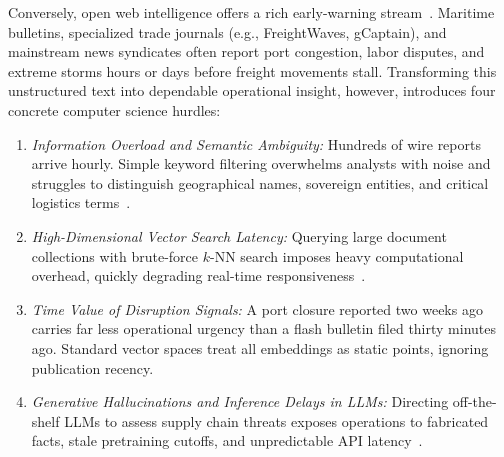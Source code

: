 \documentclass[conference]{IEEEtran}
\begin{document}
Conversely, open web intelligence offers a rich early-warning stream~\cite{jacob2025ai}. Maritime bulletins, specialized trade journals (e.g., FreightWaves, gCaptain), and mainstream news syndicates often report port congestion, labor disputes, and extreme storms hours or days before freight movements stall. Transforming this unstructured text into dependable operational insight, however, introduces four concrete computer science hurdles:
\begin{enumerate}[label=(\arabic*)]
    \item \textit{Information Overload and Semantic Ambiguity:} Hundreds of wire reports arrive hourly. Simple keyword filtering overwhelms analysts with noise and struggles to distinguish geographical names, sovereign entities, and critical logistics terms~\cite{vychegzhanin2019comparison, almoslmi2020named}.
    \item \textit{High-Dimensional Vector Search Latency:} Querying large document collections with brute-force $k$-NN search imposes heavy computational overhead, quickly degrading real-time responsiveness~\cite{li2020approximate}.
    \item \textit{Time Value of Disruption Signals:} A port closure reported two weeks ago carries far less operational urgency than a flash bulletin filed thirty minutes ago. Standard vector spaces treat all embeddings as static points, ignoring publication recency.
    \item \textit{Generative Hallucinations and Inference Delays in LLMs:} Directing off-the-shelf LLMs to assess supply chain threats exposes operations to fabricated facts, stale pretraining cutoffs, and unpredictable API latency~\cite{ma2025survey, zhu2024enhancing}.
\end{enumerate}
\end{document}
